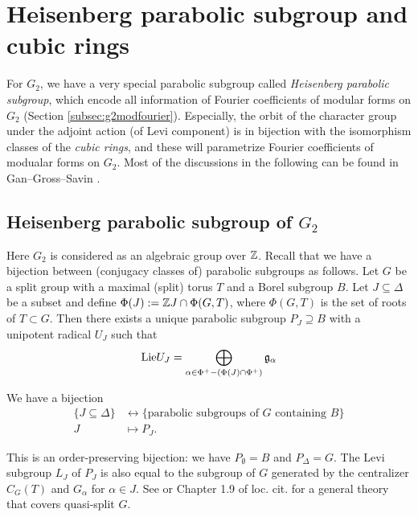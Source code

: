 \section{Heisenberg parabolic subgroup and cubic rings}
\label{sec:g2heisenberg}

For $G_2$, we have a very special parabolic subgroup called \emph{Heisenberg parabolic subgroup}, which encode all information of Fourier coefficients of modular forms on $G_2$ (Section \ref{subsec:g2modfourier}).
Especially, the orbit of the character group under the adjoint action (of Levi component) is in bijection with the isomorphism classes of the \emph{cubic rings}, and these will parametrize Fourier coefficients of modualar forms on $G_2$.
Most of the discussions in the following can be found in Gan--Gross--Savin \cite{gan2002fourier}.


\subsection{Heisenberg parabolic subgroup of $G_2$}

Here $G_2$ is considered as an algebraic group over $\mathbb{Z}$.
Recall that we have a bijection between (conjugacy classes of) parabolic subgroups as follows.
Let $G$ be a split group with a maximal (split) torus $T$ and a Borel subgroup $B$.
Let $J \subseteq \Delta$ be a subset and define $\Phi(J) := \mathbb{Z} J \cap \Phi(G, T)$, where $\Phi(G, T)$ is the set of roots of $T \subset G$.
Then there exists a unique parabolic subgroup $P_J \supseteq B$ with a unipotent radical $U_J$ such that
$$
    \mathrm{Lie} U_J = \bigoplus_{\alpha \in \Phi^+ - (\Phi(J) \cap \Phi^+)} \mathfrak{g}_\alpha
$$
\begin{theorem}
We have a bijection
\begin{align*}
    \{ J \subseteq \Delta\} &\leftrightarrow \{\text{parabolic subgroups of }G \text{ containing }B\}     \\
    J &\mapsto P_J.
\end{align*}
\end{theorem}
This is an order-preserving bijection: we have $P_{\emptyset} = B$ and $P_{\Delta} = G$.
The Levi subgroup $L_J$ of $P_J$ is also equal to the subgroup of $G$ generated by the centralizer $C_G(T)$ and $G_\alpha$ for $\alpha \in J$.
See \cite[Theorem 1.9.2]{getz2023introduction} or Chapter 1.9 of loc. cit. for a general theory that covers quasi-split $G$.


